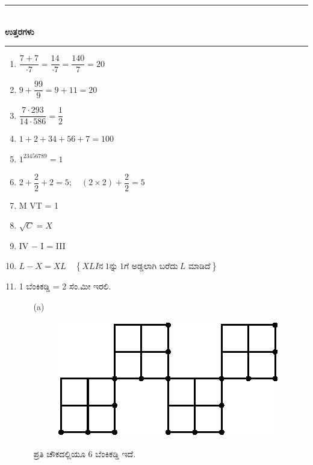 \medskip

\begin{center}
\rule{5cm}{1pt}\\[3pt]
{\Large\bfseries ಉತ್ತರಗಳು}\\[-0.1cm]
\rule{5cm}{1pt}
\end{center}

\begin{enumerate}
\itemsep=5pt

\item $\dfrac{7+7}{\cdot 7} = \dfrac{14}{\cdot 7} = \dfrac{140}{7} = 20$

\item $9 + \dfrac{99}{9} = 9 + 11 = 20$

\item $\dfrac{7\cdot 293}{14\cdot 586} = \dfrac{1}{2}$

\item $1+2+34+56+7 = 100$

\item $1^{23456789} = 1$

\item $2 + \dfrac{2}{2} + 2 = 5;\quad (2 \times 2)  + \dfrac{2}{2} = 5$

\item M \qquad VT = 1

\item $\sqrt{C} = X$

\item IV $-$ I = III

\item $L - X = XL\quad \left\{XLI \text{ನ} ~1 \text{ನ್ನು} ~1 \text{ಗೆ ಅಡ್ಡಲಾಗಿ ಬರೆದು} ~L \text{ ಮಾಡಿದೆ} \right\}$


\item 1 ಬೆಂಕಿಕಡ್ಡಿ = 2 ಸೆಂ.ಮೀ ಇರಲಿ. 

\begin{itemize}
\item[(a)] 
~

\begin{minipage}[c]{5cm}
\begin{figure}[H]
\centering
\includegraphics{images/chap7/ans11a.eps}
\end{figure}
\end{minipage}
\begin{minipage}[c]{4cm}
ಪ್ರತಿ ಚೌಕದಲ್ಲಿಯೂ 6 ಬೆಂಕಿಕಡ್ಡಿ ಇದೆ. 


\end{minipage}
\end{itemize}
\end{enumerate}

